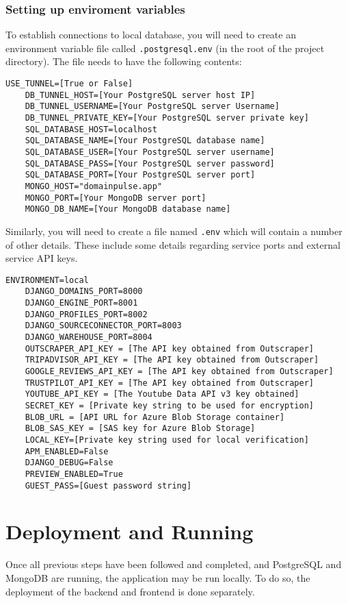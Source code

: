 \documentclass[12pt]{article}
\begin{document}
\subsubsection{Setting up enviroment variables}
To establish connections to local database, you will need to create an environment variable file called \texttt{.postgresql.env} (in the root of the project directory). The file
needs to have the following contents:
\begin{lstlisting}[basicstyle=\ttfamily]
    USE_TUNNEL=[True or False]
    DB_TUNNEL_HOST=[Your PostgreSQL server host IP]
    DB_TUNNEL_USERNAME=[Your PostgreSQL server Username]
    DB_TUNNEL_PRIVATE_KEY=[Your PostgreSQL server private key]
    SQL_DATABASE_HOST=localhost
    SQL_DATABASE_NAME=[Your PostgreSQL database name]
    SQL_DATABASE_USER=[Your PostgreSQL server username]
    SQL_DATABASE_PASS=[Your PostgreSQL server password]
    SQL_DATABASE_PORT=[Your PostgreSQL server port]
    MONGO_HOST="domainpulse.app"
    MONGO_PORT=[Your MongoDB server port]
    MONGO_DB_NAME=[Your MongoDB database name]
\end{lstlisting}

Similarly, you will need to create a file named \texttt{.env} which will contain a number of other details. These include some details
regarding service ports and external service API keys.
\begin{lstlisting}[basicstyle=\ttfamily]
    ENVIRONMENT=local
    DJANGO_DOMAINS_PORT=8000
    DJANGO_ENGINE_PORT=8001
    DJANGO_PROFILES_PORT=8002
    DJANGO_SOURCECONNECTOR_PORT=8003
    DJANGO_WAREHOUSE_PORT=8004
    OUTSCRAPER_API_KEY = [The API key obtained from Outscraper]
    TRIPADVISOR_API_KEY = [The API key obtained from Outscraper]
    GOOGLE_REVIEWS_API_KEY = [The API key obtained from Outscraper]
    TRUSTPILOT_API_KEY = [The API key obtained from Outscraper]
    YOUTUBE_API_KEY = [The Youtube Data API v3 key obtained]
    SECRET_KEY = [Private key string to be used for encryption]
    BLOB_URL = [API URL for Azure Blob Storage container]
    BLOB_SAS_KEY = [SAS key for Azure Blob Storage]
    LOCAL_KEY=[Private key string used for local verification]
    APM_ENABLED=False
    DJANGO_DEBUG=False
    PREVIEW_ENABLED=True
    GUEST_PASS=[Guest password string]
\end{lstlisting}



\section{Deployment and Running}
Once all previous steps have been followed and completed, and PostgreSQL and MongoDB are running, the application may be run locally. To do so,
the deployment of the backend and frontend is done separately.
\end{document}

